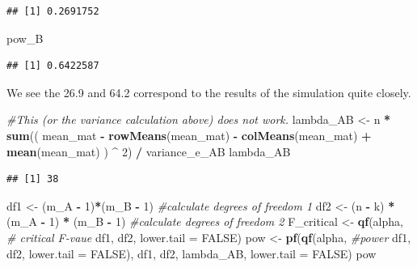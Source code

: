 \documentclass[]{book}
\newenvironment{Shaded}{\begin{snugshade}}{\end{snugshade}}
\newcommand{\CommentTok}[1]{\textcolor[rgb]{0.56,0.35,0.01}{\textit{#1}}}
\newcommand{\DataTypeTok}[1]{\textcolor[rgb]{0.13,0.29,0.53}{#1}}
\newcommand{\DecValTok}[1]{\textcolor[rgb]{0.00,0.00,0.81}{#1}}
\newcommand{\KeywordTok}[1]{\textcolor[rgb]{0.13,0.29,0.53}{\textbf{#1}}}
\newcommand{\NormalTok}[1]{#1}
\newcommand{\OperatorTok}[1]{\textcolor[rgb]{0.81,0.36,0.00}{\textbf{#1}}}
\newcommand{\OtherTok}[1]{\textcolor[rgb]{0.56,0.35,0.01}{#1}}
\newcommand{\StringTok}[1]{\textcolor[rgb]{0.31,0.60,0.02}{#1}}
\begin{document}
\begin{verbatim}
## [1] 0.2691752
\end{verbatim}

\begin{Shaded}
\begin{Highlighting}[]
\NormalTok{pow_B}
\end{Highlighting}
\end{Shaded}

\begin{verbatim}
## [1] 0.6422587
\end{verbatim}

We see the 26.9 and 64.2 correspond to the results of the simulation quite closely.

\begin{Shaded}
\begin{Highlighting}[]
\CommentTok{#This (or the variance calculation above) does not work. }
\NormalTok{lambda_AB <-}\StringTok{ }\NormalTok{n }\OperatorTok{*}\StringTok{ }\KeywordTok{sum}\NormalTok{((}
\NormalTok{  mean_mat }\OperatorTok{-}\StringTok{ }\KeywordTok{rowMeans}\NormalTok{(mean_mat) }\OperatorTok{-}\StringTok{ }\KeywordTok{colMeans}\NormalTok{(mean_mat) }\OperatorTok{+}\StringTok{ }\KeywordTok{mean}\NormalTok{(mean_mat)}
\NormalTok{  ) }\OperatorTok{^}\StringTok{ }\DecValTok{2}\NormalTok{) }\OperatorTok{/}\StringTok{ }\NormalTok{variance_e_AB }
\NormalTok{lambda_AB}
\end{Highlighting}
\end{Shaded}

\begin{verbatim}
## [1] 38
\end{verbatim}

\begin{Shaded}
\begin{Highlighting}[]
\NormalTok{df1 <-}\StringTok{ }\NormalTok{(m_A }\OperatorTok{-}\StringTok{ }\DecValTok{1}\NormalTok{)}\OperatorTok{*}\NormalTok{(m_B }\OperatorTok{-}\StringTok{ }\DecValTok{1}\NormalTok{)  }\CommentTok{#calculate degrees of freedom 1}
\NormalTok{df2 <-}\StringTok{ }\NormalTok{(n }\OperatorTok{-}\StringTok{ }\NormalTok{k) }\OperatorTok{*}\StringTok{ }\NormalTok{(m_A }\OperatorTok{-}\StringTok{ }\DecValTok{1}\NormalTok{) }\OperatorTok{*}\StringTok{ }\NormalTok{(m_B }\OperatorTok{-}\StringTok{ }\DecValTok{1}\NormalTok{) }\CommentTok{#calculate degrees of freedom 2}
\NormalTok{F_critical <-}\StringTok{ }\KeywordTok{qf}\NormalTok{(alpha, }\CommentTok{# critical F-vaue}
\NormalTok{                 df1,}
\NormalTok{                 df2, }
                 \DataTypeTok{lower.tail =} \OtherTok{FALSE}\NormalTok{) }
\NormalTok{pow <-}\StringTok{ }\KeywordTok{pf}\NormalTok{(}\KeywordTok{qf}\NormalTok{(alpha, }\CommentTok{#power }
\NormalTok{             df1, }
\NormalTok{             df2, }
             \DataTypeTok{lower.tail =} \OtherTok{FALSE}\NormalTok{), }
\NormalTok{          df1, }
\NormalTok{          df2, }
\NormalTok{          lambda_AB, }
          \DataTypeTok{lower.tail =} \OtherTok{FALSE}\NormalTok{)}
\NormalTok{pow}
\end{Highlighting}
\end{Shaded}
\end{document}
